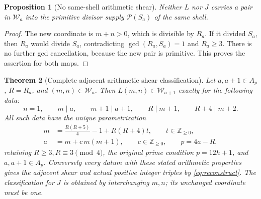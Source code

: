 \documentclass[11pt]{article}
\newtheorem{theorem}{Theorem}[section]
\newtheorem{proposition}[theorem]{Proposition}
\theoremstyle{definition}\newtheorem{definition}[theorem]{Definition}
\theoremstyle{remark}\newtheorem{remark}[theorem]{Remark}
\newcommand{\Z}{\mathbb Z}\newcommand{\Q}{\mathbb Q}
\begin{document}
\begin{proposition}[No same-shell arithmetic shear]\label{prop:no-shear}
Neither \(L\) nor \(J\) carries a pair in \(\mathcal W_a\)
into the primitive divisor supply \(\mathcal P(S_a)\) of the
same shell.
\end{proposition}
\begin{proof}
The new coordinate is \(m+n>0\), which is divisible by \(R_a\).
If it divided \(S_a\), then \(R_a\) would divide \(S_a\),
contradicting \(\gcd(R_a,S_a)=1\) and \(R_a\ge3\).
There is no further gcd cancellation, because the new pair
is primitive.  This proves the assertion for both maps.
\end{proof}

\begin{theorem}[Complete adjacent arithmetic shear classification]\label{thm:shear}
Let \(a,a+1\in A_p\), \(R=R_a\), and \((m,n)\in\mathcal W_a\).
Then \(L(m,n)\in\mathcal W_{a+1}\) exactly for the following data:
\begin{equation}\label{eq:shear-domain}
 n=1,\qquad m\mid a,\qquad m+1\mid a+1,\qquad
 R\mid m+1,\qquad R+4\mid m+2.
\end{equation}
All such data have the unique parametrization
\begin{align}
 m&=\frac{R(R+5)}4-1+R(R+4)t,\qquad t\in\Z_{\ge0},
                    \label{eq:shear-m}\\
 a&=m+c\,m(m+1),\qquad c\in\Z_{\ge0},\qquad
 p=4a-R,              \label{eq:shear-ap}
\end{align}
retaining \(R\ge3,R\equiv3\pmod4\), the original prime condition
\(p=12h+1\), and \(a,a+1\in A_p\).
Conversely every datum with these stated arithmetic properties
gives the adjacent shear and actual positive integer triples by
\eqref{eq:reconstruct}.  The classification for \(J\) is obtained
by interchanging \(m,n\); its unchanged coordinate must be one.
\end{theorem}
\end{document}
